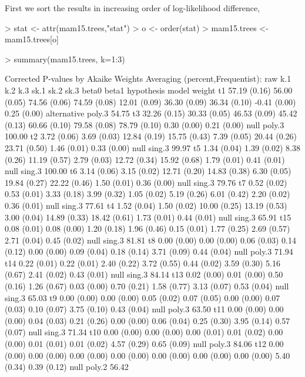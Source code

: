 \documentclass[a4paper]{amsart}
\begin{document}
First we sort the results in increasing order of log-likelihood difference,
\begin{Schunk}
\begin{Sinput}
> stat <- attr(mam15.trees,"stat")
> o <- order(stat)
> mam15.trees <- mam15.trees[o]
\end{Sinput}
\end{Schunk}
\begin{Schunk}
\begin{Sinput}
> summary(mam15.trees, k=1:3)
\end{Sinput}
\end{Schunk}
{\tiny
\begin{Schunk}
\begin{Soutput}
Corrected P-values by Akaike Weights Averaging (percent,Frequentist):
    raw          k.1          k.2          k.3          sk.1         sk.2         sk.3         beta0        beta1       hypothesis  model  weight 
t1  57.19 (0.16) 56.00 (0.05) 74.56 (0.06) 74.59 (0.08) 12.01 (0.09) 36.30 (0.09) 36.34 (0.10) -0.41 (0.00) 0.25 (0.00) alternative poly.3  54.75 
t3  32.26 (0.15) 30.33 (0.05) 46.53 (0.09) 45.42 (0.13) 60.66 (0.10) 79.58 (0.08) 78.79 (0.10)  0.30 (0.00) 0.21 (0.00) null        poly.3 100.00 
t2   3.72 (0.06)  3.69 (0.03) 12.84 (0.19) 15.75 (0.43)  7.39 (0.05) 20.44 (0.26) 23.71 (0.50)  1.46 (0.01) 0.33 (0.00) null        sing.3  99.97 
t5   1.34 (0.04)  1.39 (0.02)  8.38 (0.26) 11.19 (0.57)  2.79 (0.03) 12.72 (0.34) 15.92 (0.68)  1.79 (0.01) 0.41 (0.01) null        sing.3 100.00 
t6   3.14 (0.06)  3.15 (0.02) 12.71 (0.20) 14.83 (0.38)  6.30 (0.05) 19.84 (0.27) 22.22 (0.46)  1.50 (0.01) 0.36 (0.00) null        sing.3  79.76 
t7   0.52 (0.02)  0.53 (0.01)  3.33 (0.18)  3.99 (0.32)  1.05 (0.02)  5.19 (0.26)  6.01 (0.42)  2.20 (0.02) 0.36 (0.01) null        sing.3  77.61 
t4   1.52 (0.04)  1.50 (0.02) 10.00 (0.25) 13.19 (0.53)  3.00 (0.04) 14.89 (0.33) 18.42 (0.61)  1.73 (0.01) 0.44 (0.01) null        sing.3  65.91 
t15  0.08 (0.01)  0.08 (0.00)  1.20 (0.18)  1.96 (0.46)  0.15 (0.01)  1.77 (0.25)  2.69 (0.57)  2.71 (0.04) 0.45 (0.02) null        sing.3  81.81 
t8   0.00 (0.00)  0.00 (0.00)  0.06 (0.03)  0.14 (0.12)  0.00 (0.00)  0.09 (0.04)  0.18 (0.14)  3.71 (0.09) 0.44 (0.04) null        poly.3  71.94 
t14  0.22 (0.01)  0.22 (0.01)  2.40 (0.22)  3.72 (0.55)  0.44 (0.02)  3.59 (0.30)  5.16 (0.67)  2.41 (0.02) 0.43 (0.01) null        sing.3  84.14 
t13  0.02 (0.00)  0.01 (0.00)  0.50 (0.16)  1.26 (0.67)  0.03 (0.00)  0.70 (0.21)  1.58 (0.77)  3.13 (0.07) 0.53 (0.04) null        sing.3  65.03 
t9   0.00 (0.00)  0.00 (0.00)  0.05 (0.02)  0.07 (0.05)  0.00 (0.00)  0.07 (0.03)  0.10 (0.07)  3.75 (0.10) 0.43 (0.04) null        poly.3  63.50 
t11  0.00 (0.00)  0.00 (0.00)  0.04 (0.03)  0.21 (0.26)  0.00 (0.00)  0.06 (0.04)  0.25 (0.30)  3.95 (0.14) 0.57 (0.07) null        sing.3  71.34 
t10  0.00 (0.00)  0.00 (0.00)  0.00 (0.01)  0.01 (0.02)  0.00 (0.00)  0.01 (0.01)  0.01 (0.02)  4.57 (0.29) 0.65 (0.09) null        poly.3  84.06 
t12  0.00 (0.00)  0.00 (0.00)  0.00 (0.00)  0.00 (0.00)  0.00 (0.00)  0.00 (0.00)  0.00 (0.00)  5.40 (0.34) 0.39 (0.12) null        poly.2  56.42 
\end{Soutput}
\end{Schunk}
}
\end{document}
